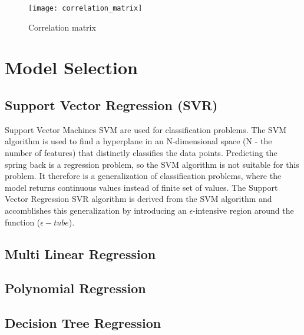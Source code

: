 \begin{figure}[H]
    \centering
    \texttt{[image: correlation\_matrix]}
    \caption{Correlation matrix}
    \label{fig:correlation_matrix}
\end{figure}

\section{Model Selection}
\subsection{Support Vector Regression (SVR)}
Support Vector Machines \ac{SVM} are used for classification problems. The \ac{SVM} algorithm is used to find a hyperplane in an N-dimensional space (N - the number of features) that distinctly classifies the data points. \cite[p. 42]{awad_efficientlearningmachines_2015}
Predicting the spring back is a regression problem, so the \ac{SVM} algorithm is not suitable for this problem. It therefore is a generalization of classification problems, where the model returns continuous values instead of finite set of values.
The Support Vector Regression \ac{SVR} algorithm is derived from the \ac{SVM} algorithm and accomblishes this generalization by introducing an $\epsilon$-intensive region around the function ($\epsilon-tube$).  \cite[p. 67]{awad_efficientlearningmachines_2015}

\subsection{Multi Linear Regression}
\subsection{Polynomial Regression}
\subsection{Decision Tree Regression}
